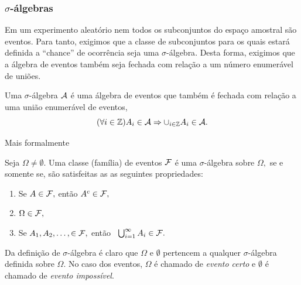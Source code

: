 \begin{frame}
\frametitle{$\sigma$-álgebras}
Em um experimento aleatório nem  todos os subconjuntos do espaço amostral são eventos. Para
tanto, exigimos que a classe de subconjuntos para os quais estará definida a
``chance'' de ocorrência seja uma {$\sigma$-álgebra}. Desta forma, exigimos que a álgebra de eventos também seja fechada com relação a um número enumerável de uniões.

\begin{defi}
	Uma $\sigma$-álgebra ${\cal A}$ é uma álgebra de eventos que também
	é fechada com relação a uma união enumerável de eventos,
	$$(\forall i\in \mathbb{Z}) A_i\in{\cal A}\Rightarrow \cup_{i\in \mathbb{Z}}A_i\in {\cal A}.$$
\end{defi}
Mais formalmente
\begin{defi}
	Seja $\Omega\neq \emptyset.$  Uma classe (família) de eventos ${\cal F}$  é uma {$\sigma$-álgebra} sobre $\Omega,$  se e somente se, são satisfeitas as 
	as seguintes propriedades: 
	\begin{enumerate}
		
		\item Se $A\in{\cal F},$ então $A^c\in{\cal
			F},$  
		\item $\Omega \in {\cal F},$ 
		\item  Se $A_1, A_2, \ldots, \in {\cal F},$ 
		então \ $\bigcup_{i=1}^\infty A_i \in {\cal F}.$ 
	\end{enumerate}
\end{defi}

Da definição de  $\sigma$-álgebra é claro que $\Omega$ e $\emptyset$ pertencem a qualquer $\sigma$-álgebra definida sobre $\Omega.$
No caso dos eventos,  $\Omega$ é chamado de {\it evento certo} e $\emptyset$ é chamado de {\it evento impossível}.
\end{frame}

